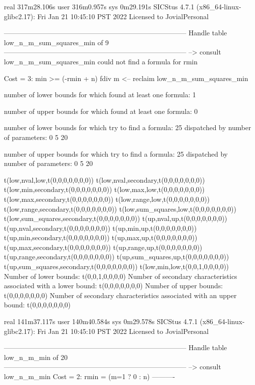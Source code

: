 real	317m28.106s
user	316m0.957s
sys	0m29.191s
SICStus 4.7.1 (x86_64-linux-glibc2.17): Fri Jan 21 10:45:10 PST 2022
Licensed to JovialPersonal


--------------------------------------------------------------------------------
Handle table low_n_m_sum_squares_min of 9
--------------------------------------------------------------------------------
--> consult low_n_m_sum_squares_min
could not find a formula for rmin

Cost =  3:  min >= (-rmin + n) fdiv m %
<-- reclaim low_n_m_sum_squares_min

number of lower bounds for which found at least one formula: 1

number of upper bounds for which found at least one formula: 0

number of lower bounds for which try to find a formula: 25
dispatched by number of parameters: 0  5  20

number of upper bounds for which try to find a formula: 25
dispatched by number of parameters: 0  5  20

t(low,nval,low,t(0,0,0,0,0,0,0))
t(low,nval,secondary,t(0,0,0,0,0,0,0))
t(low,min,secondary,t(0,0,0,0,0,0,0))
t(low,max,low,t(0,0,0,0,0,0,0))
t(low,max,secondary,t(0,0,0,0,0,0,0))
t(low,range,low,t(0,0,0,0,0,0,0))
t(low,range,secondary,t(0,0,0,0,0,0,0))
t(low,sum_squares,low,t(0,0,0,0,0,0,0))
t(low,sum_squares,secondary,t(0,0,0,0,0,0,0))
t(up,nval,up,t(0,0,0,0,0,0,0))
t(up,nval,secondary,t(0,0,0,0,0,0,0))
t(up,min,up,t(0,0,0,0,0,0,0))
t(up,min,secondary,t(0,0,0,0,0,0,0))
t(up,max,up,t(0,0,0,0,0,0,0))
t(up,max,secondary,t(0,0,0,0,0,0,0))
t(up,range,up,t(0,0,0,0,0,0,0))
t(up,range,secondary,t(0,0,0,0,0,0,0))
t(up,sum_squares,up,t(0,0,0,0,0,0,0))
t(up,sum_squares,secondary,t(0,0,0,0,0,0,0))
t(low,min,low,t(0,0,1,0,0,0,0))
Number of lower bounds:                                             t(0,0,1,0,0,0,0)
Number of secondary characteristics associated with a lower bound:  t(0,0,0,0,0,0,0)
Number of upper bounds:                                             t(0,0,0,0,0,0,0)
Number of secondary characteristics associated with an upper bound: t(0,0,0,0,0,0,0)

real	141m37.117s
user	140m40.584s
sys	0m29.578s
SICStus 4.7.1 (x86_64-linux-glibc2.17): Fri Jan 21 10:45:10 PST 2022
Licensed to JovialPersonal


--------------------------------------------------------------------------------
Handle table low_n_m_min of 20
--------------------------------------------------------------------------------
--> consult low_n_m_min
Cost =  2:  rmin = (m=1 ? 0 : n)
----------

